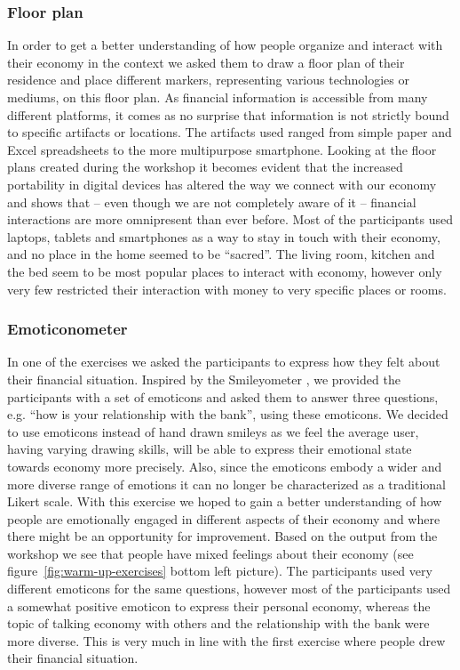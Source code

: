 \subsubsection*{Floor plan}
In order to get a better understanding of how people organize and interact with their economy in the context we asked them to draw a floor plan of their residence and place different markers, representing various technologies or mediums, on this floor plan.
As financial information is accessible from many different platforms, it comes as no surprise that information is not strictly bound to specific artifacts or locations. The artifacts used ranged from simple paper and Excel spreadsheets to the more multipurpose smartphone. Looking at the floor plans created during the workshop it becomes evident that the increased portability in digital devices has altered the way we connect with our economy and shows that – even though we are not completely aware of it – financial interactions are more omnipresent than ever before. Most of the participants used laptops, tablets and smartphones as a way to stay in touch with their economy, and no place in the home seemed to be “sacred”. The living room, kitchen and the bed seem to be most popular places to interact with economy, however only very few restricted their interaction with money to very specific places or rooms.

\subsubsection*{Emoticonometer}
In one of the exercises we asked the participants to express how they felt about their financial situation. Inspired by the Smileyometer \cite{read2006using}, we provided the participants with a set of emoticons and asked them to answer three questions, e.g. “how is your relationship with the bank”, using these emoticons. We decided to use emoticons instead of hand drawn smileys as we feel the average user, having varying drawing skills, will be able to express their emotional state towards economy more precisely. Also, since the emoticons embody a wider and more diverse range of emotions it can no longer be characterized as a traditional Likert scale. With this exercise we hoped to gain a better understanding of how people are emotionally engaged in different aspects of their economy and where there might be an opportunity for improvement. Based on the output from the workshop we see that people have mixed feelings about their economy (see figure~\ref{fig:warm-up-exercises} bottom left picture). The participants used very different emoticons for the same questions, however most of the participants used a somewhat positive emoticon to express their personal economy, whereas the topic of talking economy with others and the relationship with the bank were more diverse. This is very much in line with the first exercise where people drew their financial situation.


